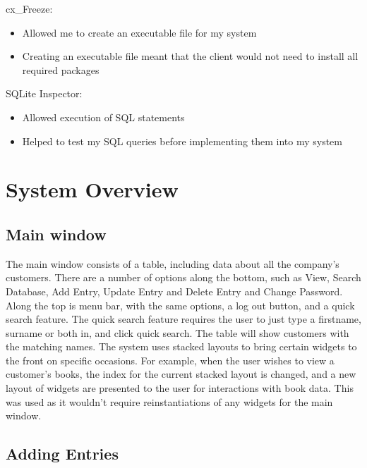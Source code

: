 cx\_Freeze:
\begin{itemize}
    \item Allowed me to create an executable file for my system
    \item Creating an executable file meant that the client would not need to install all required packages
\end{itemize}


SQLite Inspector:
\begin{itemize}
    \item Allowed execution of SQL statements
    \item Helped to test my SQL queries before implementing them into my system
\end{itemize}


\section{System Overview}

\subsection{Main window}

The main window consists of a table, including data about all the company's customers. There are a number of options along the bottom, such as View, Search Database, Add Entry, Update Entry and Delete Entry and Change Password. Along the top is  menu bar, with the same options, a log out button, and a quick search feature. The quick search feature requires the user to just type a firstname, surname or both in, and click quick search. The table will show customers with the matching names. The system uses stacked layouts to bring certain widgets to the front on specific occasions. For example, when the user wishes to view a customer's books, the index for the current stacked layout is changed, and a new layout of widgets are presented to the user for interactions with book data. This was used as it wouldn't require reinstantiations of any widgets for the main window.

\subsection{Adding Entries}


